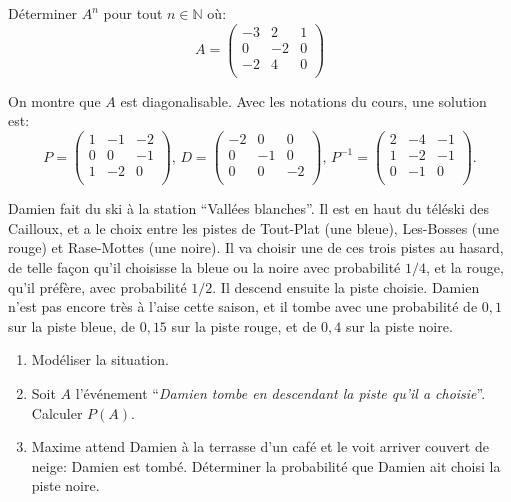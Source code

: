 \documentclass[a4paper,11pt]{article}
\begin{document}
\begin{colle}

\begin{exercice}
  Déterminer $A^n$ pour tout $n\in\mathbb{N}$ où:
  \[
    A = \begin{pmatrix}
        -3 & 2 & 1\\
        0 & -2 & 0\\
        -2 & 4 & 0\\
    \end{pmatrix}
  \]
\begin{correction}
On montre que $A$ est diagonalisable. Avec les notations du cours, une solution 
est:
\[ P =\begin{pmatrix}
  1 & -1 & -2\\
  0 & 0 & -1\\
  1 & -2 & 0\\
\end{pmatrix},\, D =\begin{pmatrix}
  -2 & 0 & 0\\
  0 & -1 & 0\\
  0 & 0 & -2\\
\end{pmatrix},\, P^{-1} =\begin{pmatrix}
  2 & -4 & -1\\
  1 & -2 & -1\\
  0 & -1 & 0\\
\end{pmatrix}.\]
\end{correction}

\end{exercice}

\begin{exercice}
     Damien fait du ski à la station ``Vallées blanches''. Il est en
    haut du téléski des Cailloux, et a le choix entre les pistes de
    Tout-Plat (une bleue), Les-Bosses (une rouge) et Rase-Mottes (une
    noire). Il va choisir une de ces trois pistes au hasard, de telle
    façon qu'il choisisse la bleue ou la noire avec probabilité $1/4$,
    et la rouge, qu'il préfère, avec probabilité $1/2$. Il descend
    ensuite la piste choisie. Damien n'est pas encore très à l'aise
    cette saison, et il tombe avec une probabilité de $0,1$ sur la
    piste bleue, de $0,15$ sur la piste rouge, et de $0,4$ sur la
    piste noire.
    \begin{enumerate}
        \item Modéliser la situation.
        \item Soit $A$ l'événement ``\emph{Damien tombe en descendant la piste
            qu'il a choisie}''. Calculer $P(A)$.
        \item Maxime attend Damien à la terrasse d'un
            café et le voit arriver couvert de neige: Damien est tombé.
            Déterminer la probabilité que Damien ait choisi la piste noire.
    \end{enumerate}

\end{exercice}



\end{colle}


\solutions
\end{document}
